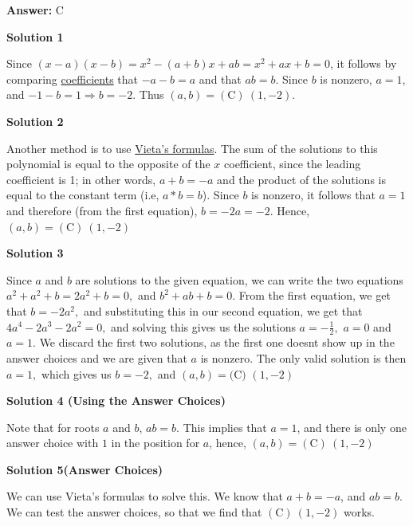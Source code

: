 \begin{enumerate}
 \textbf{Answer: }C



\textbf{Solution 1}

Since $(x-a)(x-b) = x^2 - (a+b)x + ab = x^2 + ax + b = 0$, it follows by comparing \href{https://artofproblemsolving.com/wiki/index.php?title=Coefficient}{coefficients} that $-a - b = a$ and that $ab = b$. Since $b$ is nonzero, $a = 1$, and $-1 - b = 1 \Longrightarrow b = -2$. Thus $(a,b) = \boxed{\mathrm{(C)}\ (1,-2)}$.

 



\textbf{Solution 2}

Another method is to use \href{https://artofproblemsolving.com/wiki/index.php?title=Vieta\%27s\_formulas}{Vieta's formulas}. The sum of the solutions to this polynomial is equal to the opposite of the $x$ coefficient, since the leading coefficient is 1; in other words, $a + b = -a$ and the product of the solutions is equal to the constant term (i.e, $a*b = b$). Since $b$ is nonzero, it follows that $a = 1$ and therefore (from the first equation), $b = -2a = -2$. Hence, $(a,b) = \boxed{\mathrm{(C)}\ (1,-2)}$




\textbf{Solution 3}

Since $a$ and $b$ are solutions to the given equation, we can write the two equations $a^2 + a^2 + b = 2a^2 + b = 0,$ and $b^2 + ab + b = 0.$ From the first equation, we get that $b = -2a^2,$ and substituting this in our second equation, we get that $4a^4 - 2a^3 - 2a^2 = 0,$ and solving this gives us the solutions $a = -\frac{1}{2},$ $a = 0$ and $a = 1.$ We discard the first two solutions, as the first one doesnt show up in the answer choices and we are given that $a$ is nonzero. The only valid solution is then $a = 1,$ which gives us $b = -2,$ and $(a, b) = \boxed{\text{(C) } (1, -2)}$




\textbf{Solution 4 (Using the Answer Choices)}

Note that for roots $a$ and $b$, $ab = b$. This implies that $a=1$, and there is only one answer choice with $1$ in the position for $a$, hence, $(a,b) = \boxed{\mathrm{(C)}\ (1,-2)}$




\textbf{Solution 5(Answer Choices)}

We can use Vieta's formulas to solve this. We know that $a + b = -a$, and $ab = b.$ We can test the answer choices, so that we find that $\boxed{\mathrm{(C)}\ (1,-2)}$ works.


\end{enumerate}

